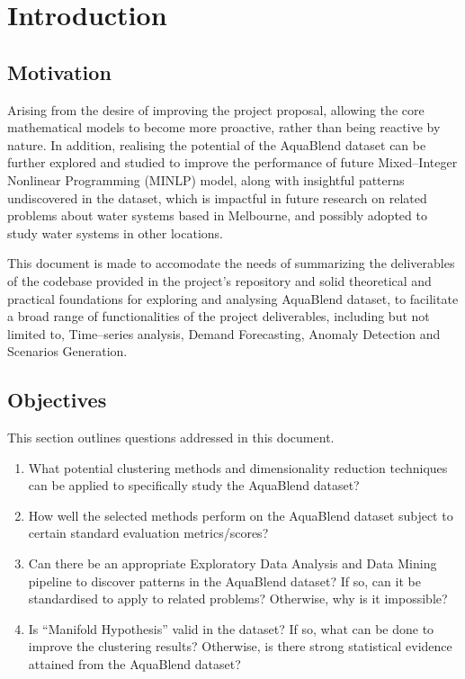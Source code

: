\section{Introduction}
\label{sec:introduction}

\subsection{Motivation}
\label{sec:introduction:motivation}

Arising from the desire of improving the project proposal, allowing the core mathematical models to become more proactive, rather than being reactive by nature.
In addition, realising the potential of the AquaBlend dataset can be further explored and studied to improve the performance of future Mixed–Integer Nonlinear Programming (MINLP) model,
along with insightful patterns undiscovered in the dataset, which is impactful in future research on related problems about water systems based in Melbourne, and possibly adopted to study water systems in other locations.

This document is made to accomodate the needs of summarizing the deliverables of the codebase provided in the project's repository and solid theoretical and practical foundations for exploring and analysing AquaBlend dataset,
to facilitate a broad range of functionalities of the project deliverables, including but not limited to, Time–series analysis, Demand Forecasting, Anomaly Detection and Scenarios Generation.


\subsection{Objectives}
\label{sec:introduction:objectives}
This section outlines questions addressed in this document.

\begin{enumerate}
  \item What potential clustering methods and dimensionality reduction techniques can be applied to specifically study the AquaBlend dataset?
  \item How well the selected methods perform on the AquaBlend dataset subject to certain standard evaluation metrics/scores?
  \item Can there be an appropriate Exploratory Data Analysis and Data Mining pipeline to discover patterns in the AquaBlend dataset? If so, can it be standardised to apply to related problems? Otherwise, why is it impossible?
  \item Is ``Manifold Hypothesis'' valid in the dataset? If so, what can be done to improve the clustering results? Otherwise, is there strong statistical evidence attained from the AquaBlend dataset?
\end{enumerate}


